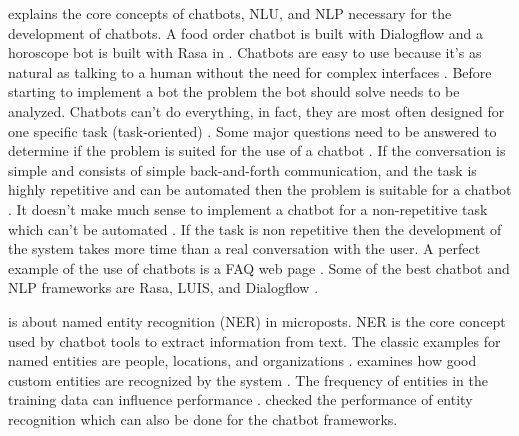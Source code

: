 \citet{buiildChatbotsPython} explains the core concepts of chatbots, NLU, and NLP necessary for the development of chatbots.
A food order chatbot is built with Dialogflow and a horoscope bot is built with Rasa in \citet{buiildChatbotsPython}.
Chatbots are easy to use because it's as natural as talking to a human without the need for complex interfaces \cite{buiildChatbotsPython}.
Before starting to implement a bot the problem the bot should solve needs to be analyzed.
Chatbots can't do everything, in fact, they are most often designed for one specific task (task-oriented) \cite{buiildChatbotsPython}.
Some major questions need to be answered to determine if the problem is suited for the use of a chatbot \cite{buiildChatbotsPython}.
If the conversation is simple and consists of simple back-and-forth communication, and the task is 
highly repetitive and can be automated then the problem is suitable for a chatbot \cite{buiildChatbotsPython}.
It doesn't make much sense to implement a chatbot for a non-repetitive task which can't be automated \cite{buiildChatbotsPython}.
If the task is non repetitive then the development of the system takes more 
time than a real conversation with the user.
A perfect example of the use of chatbots is a FAQ web page \cite{buiildChatbotsPython}.
Some of the best chatbot and NLP frameworks are Rasa, LUIS, and Dialogflow \cite{buiildChatbotsPython}.

\citet{geyer2016named} is about named entity recognition (NER) in microposts.
NER is the core concept used by chatbot tools to extract information from text.
The classic examples for named entities are people, locations, and organizations \cite{geyer2016named}.
\citet{geyer2016named} examines how good custom entities are recognized by the system \citet{geyer2016named}.
The frequency of entities in the training data can influence performance \cite{geyer2016named}. 
\citet{geyer2016named} checked the performance of entity recognition which can also be done for the chatbot frameworks.

